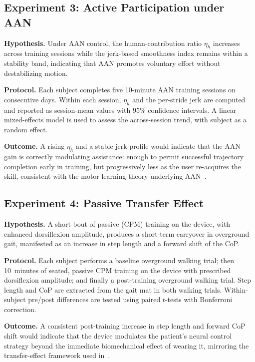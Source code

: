 \documentclass[conference]{IEEEtran}
\begin{document}
\subsection{Experiment 3: Active Participation under AAN}

\textbf{Hypothesis.} Under AAN control, the human-contribution ratio $\eta_h$ increases across training sessions while the jerk-based smoothness index remains within a stability band, indicating that AAN promotes voluntary effort without destabilizing motion.

\textbf{Protocol.} Each subject completes five 10-minute AAN training sessions on consecutive days. Within each session, $\eta_h$ and the per-stride jerk are computed and reported as session-mean values with 95\% confidence intervals. A linear mixed-effects model is used to assess the across-session trend, with subject as a random effect.

\textbf{Outcome.} A rising $\eta_h$ and a stable jerk profile would indicate that the AAN gain is correctly modulating assistance: enough to permit successful trajectory completion early in training, but progressively less as the user re-acquires the skill, consistent with the motor-learning theory underlying AAN~\cite{cai2006implications,marchal2009review}.

\subsection{Experiment 4: Passive Transfer Effect}

\textbf{Hypothesis.} A short bout of passive (CPM) training on the device, with enhanced dorsiflexion amplitude, produces a short-term carryover in overground gait, manifested as an increase in step length and a forward shift of the CoP.

\textbf{Protocol.} Each subject performs a baseline overground walking trial; then 10~minutes of seated, passive CPM training on the device with prescribed dorsiflexion amplitude; and finally a post-training overground walking trial. Step length and CoP are extracted from the gait mat in both walking trials. Within-subject pre/post differences are tested using paired $t$-tests with Bonferroni correction.

\textbf{Outcome.} A consistent post-training increase in step length and forward CoP shift would indicate that the device modulates the patient's neural control strategy beyond the immediate biomechanical effect of wearing it, mirroring the transfer-effect framework used in~\cite{galle2013adaptation,gordon2007learning}.
\end{document}
